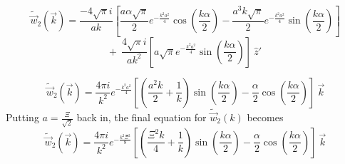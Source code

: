 \documentclass[double,12pt]{beavtex}
\begin{document}
\begin{equation}{\widetilde{\vec{w}}_2(\vec{k})=\frac{-4\sqrt{\pi}i}{ak}\left[\frac{a\alpha\sqrt{\pi}}{2}e^{-\frac{k^2a^2}{4}}\cos\left(\frac{k\alpha}{2}\right)-\frac{a^3k\sqrt{\pi}}{2}e^{-\frac{k^2a^2}{4}}\sin\left(\frac{k\alpha}{2}\right)\right]} \nonumber \end{equation} 
\begin{equation}{+{~~}\frac{4\sqrt{\pi}i}{ak^2}\left[a\sqrt{\pi}e^{-\frac{k^2a^2}{4}}\sin\left(\frac{k\alpha}{2}\right)\right]{~}\hat{z}'}\end{equation}

\begin{equation}{\widetilde{\vec{w}}_2(\vec{k})=\frac{4\pi{i}}{k^2}e^{-\frac{k^2a^2}{4}}\left[\left(\frac{a^2k}{2}+\frac{1}{k}\right)\sin\left(\frac{k\alpha}{2}\right)-\frac{\alpha}{2}\cos\left(\frac{k\alpha}{2}\right)\right]{~}\vec{k}}\end{equation} 
Putting $a=\frac{\Xi}{\sqrt{2}}$ back in, the final equation for 
$\widetilde{\vec{w}}_2(k)$ becomes
\begin{equation}{\widetilde{\vec{w}}_2(\vec{k})=\frac{4\pi{i}}{k^2}e^{-\frac{k^2\Xi^2}{8}}\left[\left(\frac{\Xi^2k}{4}+\frac{1}{k}\right)\sin\left(\frac{k\alpha}{2}\right)-\frac{\alpha}{2}\cos\left(\frac{k\alpha}{2}\right)\right]{~}\vec{k}}\end{equation} 
\end{document}

